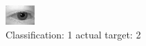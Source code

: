 \begin{figure}[h!]
\begin{center}
\includegraphics[width=0.60\columnwidth]{figures/ID351_class_1_target_2.png}
\end{center}
\caption{ Classification: 1 actual target: 2}
\label{fig:ID351_class_1_target_2}
\end{figure}

